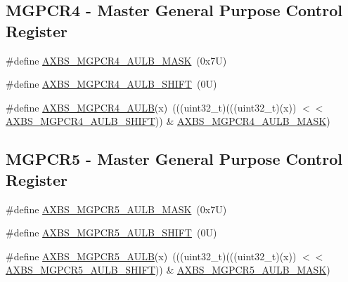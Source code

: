 \subsection*{M\+G\+P\+C\+R4 -\/ Master General Purpose Control Register}
\begin{DoxyCompactItemize}
\item 
\#define \mbox{\hyperlink{group___a_x_b_s___register___masks_ga0e8cb920fbcfaaefe210dedc102129d1}{A\+X\+B\+S\+\_\+\+M\+G\+P\+C\+R4\+\_\+\+A\+U\+L\+B\+\_\+\+M\+A\+SK}}~(0x7\+U)
\item 
\#define \mbox{\hyperlink{group___a_x_b_s___register___masks_gaf8f91ac5ba555a8dc2a1733463145139}{A\+X\+B\+S\+\_\+\+M\+G\+P\+C\+R4\+\_\+\+A\+U\+L\+B\+\_\+\+S\+H\+I\+FT}}~(0\+U)
\item 
\#define \mbox{\hyperlink{group___a_x_b_s___register___masks_gaf5b88ce31357063d80980484b8236c71}{A\+X\+B\+S\+\_\+\+M\+G\+P\+C\+R4\+\_\+\+A\+U\+LB}}(x)~(((uint32\+\_\+t)(((uint32\+\_\+t)(x)) $<$$<$ \mbox{\hyperlink{group___a_x_b_s___register___masks_gaf8f91ac5ba555a8dc2a1733463145139}{A\+X\+B\+S\+\_\+\+M\+G\+P\+C\+R4\+\_\+\+A\+U\+L\+B\+\_\+\+S\+H\+I\+FT}})) \& \mbox{\hyperlink{group___a_x_b_s___register___masks_ga0e8cb920fbcfaaefe210dedc102129d1}{A\+X\+B\+S\+\_\+\+M\+G\+P\+C\+R4\+\_\+\+A\+U\+L\+B\+\_\+\+M\+A\+SK}})
\end{DoxyCompactItemize}
\subsection*{M\+G\+P\+C\+R5 -\/ Master General Purpose Control Register}
\begin{DoxyCompactItemize}
\item 
\#define \mbox{\hyperlink{group___a_x_b_s___register___masks_gaea6c5a570e0ec08d6419d8da4e6d82fd}{A\+X\+B\+S\+\_\+\+M\+G\+P\+C\+R5\+\_\+\+A\+U\+L\+B\+\_\+\+M\+A\+SK}}~(0x7\+U)
\item 
\#define \mbox{\hyperlink{group___a_x_b_s___register___masks_gab23b7b12e97e5a14e012697fc5b4ee49}{A\+X\+B\+S\+\_\+\+M\+G\+P\+C\+R5\+\_\+\+A\+U\+L\+B\+\_\+\+S\+H\+I\+FT}}~(0\+U)
\item 
\#define \mbox{\hyperlink{group___a_x_b_s___register___masks_gad8be8f658899ebea335f64937532371f}{A\+X\+B\+S\+\_\+\+M\+G\+P\+C\+R5\+\_\+\+A\+U\+LB}}(x)~(((uint32\+\_\+t)(((uint32\+\_\+t)(x)) $<$$<$ \mbox{\hyperlink{group___a_x_b_s___register___masks_gab23b7b12e97e5a14e012697fc5b4ee49}{A\+X\+B\+S\+\_\+\+M\+G\+P\+C\+R5\+\_\+\+A\+U\+L\+B\+\_\+\+S\+H\+I\+FT}})) \& \mbox{\hyperlink{group___a_x_b_s___register___masks_gaea6c5a570e0ec08d6419d8da4e6d82fd}{A\+X\+B\+S\+\_\+\+M\+G\+P\+C\+R5\+\_\+\+A\+U\+L\+B\+\_\+\+M\+A\+SK}})
\end{DoxyCompactItemize}


